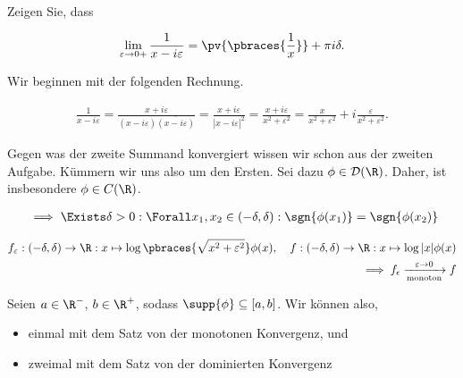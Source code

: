 
\begin{exercise}

Zeigen Sie, dass

\begin{align*}
    \lim_{\varepsilon \to 0+}
    \frac{1}{x - i \varepsilon}
    =
    \pv
    {
        \pbraces
        {
            \frac{1}{x}
        }
    }
    +
    \pi i \delta.
\end{align*}

\end{exercise}


\begin{solution}

Wir beginnen mit der folgenden Rechnung.

\begin{align*}
    \frac{1}{x - i\varepsilon}
    =
    \frac
    {
        x + i \varepsilon
    }{
        (x - i\varepsilon)
        \overline
        {
            (x - i\varepsilon)
        }
    }
    =
    \frac
    {
        x + i \varepsilon
    }{
        |x - i \varepsilon|^2
    }
    =
    \frac{x + i \varepsilon}{x^2 + \varepsilon^2}
    =
    \frac{x}{x^2 + \varepsilon^2} + i\frac{\varepsilon}{x^2 + \varepsilon^2}.
\end{align*}

Gegen was der zweite Summand konvergiert wissen wir schon aus der zweiten Aufgabe.
Kümmern wir uns also um den Ersten.
Sei dazu $\phi \in \mathcal{D}(\R)$.
Daher, ist insbesondere $\phi \in C(\R)$.

\begin{align*}
    & \implies
    \Exists \delta > 0:
    \Forall x_1, x_2 \in (-\delta, \delta):
    \sgn{\phi(x_1)} = \sgn{\phi(x_2)} \\
\end{align*}

\begin{align*}
    f_\varepsilon:
    (-\delta, \delta) \to \R:
    x \mapsto \log\pbraces{\sqrt{x^2 + \varepsilon^2}} \phi(x),
    \quad
    f:
    (-\delta, \delta) \to \R:
    x \mapsto \log{|x|} \phi(x) \\
    \implies
    f_\epsilon
    \xrightarrow[\text{monoton}]{\varepsilon \to 0} f
\end{align*}

Seien $a \in \R^-$, $b \in \R^+$, sodass $\supp{\phi} \subseteq [a, b]$.
Wir können also,
\begin{itemize}
    \item einmal mit dem Satz von der monotonen Konvergenz, und
    \item zweimal mit dem Satz von der dominierten Konvergenz
\end{itemize}


\end{solution}
